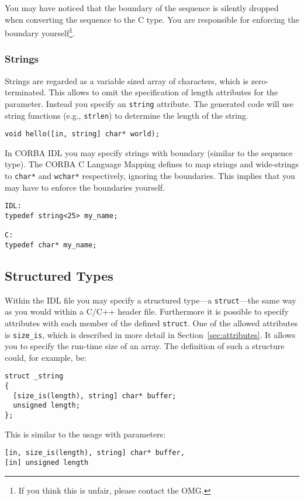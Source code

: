 You may have noticed that the boundary of the sequence is silently dropped
when converting the sequence to the C type. You are responsible for enforcing
the boundary yourself\footnote{If you think this is unfair, please contact the
OMG.}.

\subsubsection{Strings}

Strings are regarded as a variable sized array of characters, which is
zero-terminated.  This allows to omit the specification of length attributes
for the parameter. Instead you specify an \verb|string| attribute. The
generated code will use string functions (e.g., {\tt strlen}) to determine the
length of the string.

\begin{verbatim}
void hello([in, string] char* world);
\end{verbatim}

In CORBA IDL you may specify strings with boundary (similar to the sequence
type). The CORBA C Language Mapping defines to map strings and wide-strings to
\verb|char*| and \verb|wchar*| respectively, ignoring the boundaries. This
implies that you may have to enforce the boundaries yourself.

\begin{verbatim}
IDL:
typedef string<25> my_name;

C:
typedef char* my_name;
\end{verbatim}

\subsection{Structured Types}

Within the IDL file you may specify a structured type---a \verb|struct|---the
same way as you would within a C/C++ header file. Furthermore it is possible
to specify attributes with each member of the defined \verb|struct|.  One of
the allowed attributes is \verb|size_is|, which is described in more detail in
Section~\ref{sec:attributes}. It allows you to specify the run-time size of an
array. The definition of such a structure could, for example, be:

\begin{verbatim}
struct _string
{
  [size_is(length), string] char* buffer;
  unsigned length;
};
\end{verbatim}
This is similar to the usage with parameters:
\begin{verbatim}
[in, size_is(length), string] char* buffer,
[in] unsigned length
\end{verbatim}

